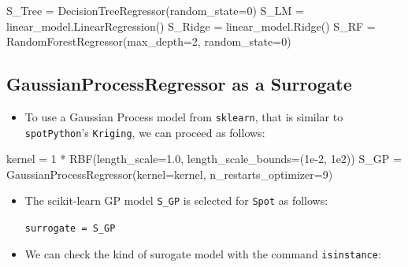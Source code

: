 \documentclass[
  letterpaper,
  DIV=11,
  numbers=noendperiod]{scrreprt}
\newenvironment{Shaded}{\begin{snugshade}}{\end{snugshade}}
\newcommand{\DecValTok}[1]{\textcolor[rgb]{0.68,0.00,0.00}{#1}}
\newcommand{\FloatTok}[1]{\textcolor[rgb]{0.68,0.00,0.00}{#1}}
\newcommand{\NormalTok}[1]{\textcolor[rgb]{0.00,0.23,0.31}{#1}}
\newcommand{\OperatorTok}[1]{\textcolor[rgb]{0.37,0.37,0.37}{#1}}
\providecommand{\tightlist}{%
  \setlength{\itemsep}{0pt}\setlength{\parskip}{0pt}}\usepackage{longtable,booktabs,array}
\begin{document}
\begin{Shaded}
\begin{Highlighting}[]
\NormalTok{S\_Tree }\OperatorTok{=}\NormalTok{ DecisionTreeRegressor(random\_state}\OperatorTok{=}\DecValTok{0}\NormalTok{)}
\NormalTok{S\_LM }\OperatorTok{=}\NormalTok{ linear\_model.LinearRegression()}
\NormalTok{S\_Ridge }\OperatorTok{=}\NormalTok{ linear\_model.Ridge()}
\NormalTok{S\_RF }\OperatorTok{=}\NormalTok{ RandomForestRegressor(max\_depth}\OperatorTok{=}\DecValTok{2}\NormalTok{, random\_state}\OperatorTok{=}\DecValTok{0}\NormalTok{)}
\end{Highlighting}
\end{Shaded}

\hypertarget{gaussianprocessregressor-as-a-surrogate}{%
\subsection{GaussianProcessRegressor as a
Surrogate}\label{gaussianprocessregressor-as-a-surrogate}}

\begin{itemize}
\tightlist
\item
  To use a Gaussian Process model from \texttt{sklearn}, that is similar
  to \texttt{spotPython}'s \texttt{Kriging}, we can proceed as follows:
\end{itemize}

\begin{Shaded}
\begin{Highlighting}[]
\NormalTok{kernel }\OperatorTok{=} \DecValTok{1} \OperatorTok{*}\NormalTok{ RBF(length\_scale}\OperatorTok{=}\FloatTok{1.0}\NormalTok{, length\_scale\_bounds}\OperatorTok{=}\NormalTok{(}\FloatTok{1e{-}2}\NormalTok{, }\FloatTok{1e2}\NormalTok{))}
\NormalTok{S\_GP }\OperatorTok{=}\NormalTok{ GaussianProcessRegressor(kernel}\OperatorTok{=}\NormalTok{kernel, n\_restarts\_optimizer}\OperatorTok{=}\DecValTok{9}\NormalTok{)}
\end{Highlighting}
\end{Shaded}

\begin{itemize}
\item
  The scikit-learn GP model \texttt{S\_GP} is selected for \texttt{Spot}
  as follows:

  \texttt{surrogate\ =\ S\_GP}
\item
  We can check the kind of surogate model with the command
  \texttt{isinstance}:
\end{itemize}
\end{document}
